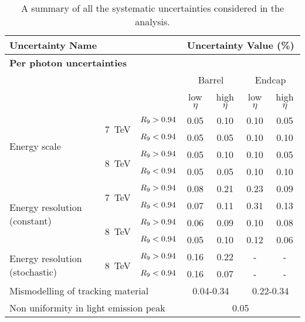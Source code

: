 \begin{table}[h!]
\caption{A summary of all the systematic uncertainties considered in the analysis.}
\footnotesize
\begin{tabular} { l | r r | c c c c }

\hline
\multicolumn{3}{l}{\textbf{Uncertainty Name}} & \multicolumn{4}{c}{\textbf{Uncertainty Value (\%)}} \\   
\hline
\hline
\multicolumn{7}{l}{\textbf{Per photon uncertainties}} \\ 
\hline
\multicolumn{3}{l}{}   & \multicolumn{2}{c}{Barrel} & \multicolumn{2}{c}{Endcap} \\
\multicolumn{3}{l}{}   & low $\eta$ & high $\eta$ & low $\eta$ & high $\eta$ \\ 
\hline
\multirow{4}{*}{Energy scale}         & \multirow{2}{*}{7~TeV}    & $R_{9} > 0.94$ & 0.05 & 0.10 & 0.10 & 0.05 \\
                                      &     & $R_{9} < 0.94$ & 0.05 & 0.05 & 0.10 & 0.10 \\
                                      & \multirow{2}{*}{8~TeV}    & $R_{9} > 0.94$ & 0.05 & 0.10 & 0.10 & 0.05 \\
                                      &          & $R_{9} < 0.94$ & 0.05 & 0.05 & 0.10 & 0.10 \\
\hline
\multirow{4}{*}{Energy resolution (constant)}    & \multirow{2}{*}{7~TeV}  & $R_{9} > 0.94$ & 0.08 & 0.21 & 0.23 & 0.09 \\
                                                      &                         & $R_{9} < 0.94$ & 0.07 & 0.11 & 0.31 & 0.13 \\
                                                      & \multirow{2}{*}{8~TeV}  & $R_{9} > 0.94$ & 0.06 & 0.09 & 0.10 & 0.08 \\
                                                      &                         & $R_{9} < 0.94$ & 0.05 & 0.10 & 0.12 & 0.06 \\
\hline
\multirow{2}{*}{Energy resolution (stochastic)}  & \multirow{2}{*}{8~TeV}  & $R_{9} > 0.94$ & 0.16 & 0.22 & - & - \\
                                                      &                         & $R_{9} < 0.94$ & 0.16 & 0.07 & - & - \\
\hline
\multicolumn{3}{l|}{Mismodelling of tracking material}                     & \multicolumn{2}{c}{0.04-0.34} & \multicolumn{2}{c}{0.22-0.34} \\
\multicolumn{3}{l|}{Non uniformity in light emission peak}                 & \multicolumn{4}{c}{0.05} \\

\end{tabular}
\end{table}
